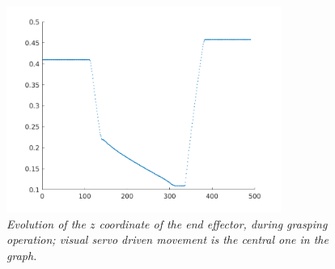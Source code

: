 \begin{figure}
	\centering
	\includegraphics[width=0.8\textwidth]{Images/experimental_data/grasping_z.png}
	\caption{\textit{Evolution of the $z$ coordinate of the end effector, during grasping operation; visual servo driven movement is the central one in the graph.}}
	\label{fig:graspingZ}
\end{figure}






